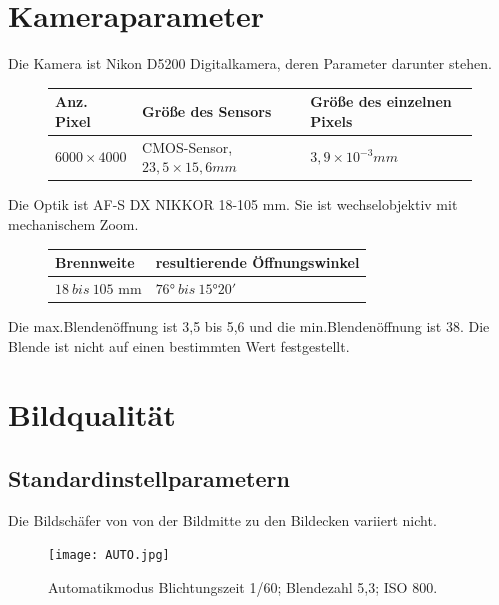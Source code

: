 \documentclass[12pt]{article}
\begin{document}
	\pagestyle{main}

\section{Kameraparameter}
Die Kamera ist Nikon D5200 Digitalkamera, deren Parameter darunter stehen.
\begin{figure}[ht]\centering
	\begin{tabular}{|l|l|l|}
		\hline
		Anz. Pixel & Größe des Sensors        & Größe des einzelnen Pixels \\ \hline
		$6000 \times 4000$  & CMOS-Sensor,$23,5 \times 15,6 mm$ & $3,9 \times 10^{-3} mm $ \\ \hline
	\end{tabular}
\end{figure}
\newline
Die Optik ist AF-S DX NIKKOR 18-105 mm. Sie ist wechselobjektiv mit mechanischem Zoom. 
\begin{figure}[ht]\centering
	\begin{tabular}{|l|l|}
		\hline
		Brennweite & resultierende Öffnungswinkel         \\ \hline
		$18 \ bis \ 105$ mm  & $76°\  bis\  15°20'$  \\ \hline
	\end{tabular}
\end{figure}
\newline
Die max.Blendenöffnung ist 3,5 bis 5,6 und die min.Blendenöffnung ist 38. Die Blende ist nicht auf einen bestimmten Wert festgestellt.

\section{Bildqualität}
\subsection{Standardinstellparametern}
Die Bildschäfer von von der Bildmitte zu den Bildecken variiert nicht. \newline
\begin{figure}[ht]\centering
\texttt{[image: AUTO.jpg]}
\caption{Automatikmodus Blichtungszeit 1/60; Blendezahl 5,3; ISO 800.}
\end{figure}
\end{document}
